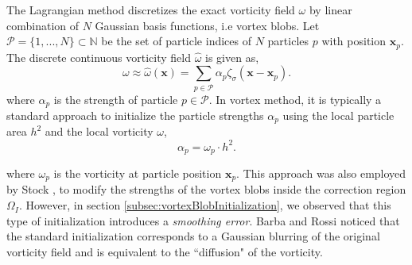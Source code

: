 
	The Lagrangian method discretizes the exact vorticity field $\omega$ by linear combination of $N$ Gaussian basis functions, i.e vortex blobs. Let $\mathcal{P} = \{1,...,N\}\subset\mathbb{N}$ be the set of particle indices of $N$ particles $p$ with position $\mathbf{x}_p$. The discrete continuous vorticity field $\hat{\omega}$ is given as,
		\begin{equation}
		\omega \approx \hat{\omega}(\mathbf{x}) = \sum_{p\in\mathcal{P}} \alpha_p \zeta_{\sigma}(\mathbf{x} - \mathbf{x}_p).
		\label{eq:coupling-mollifiedVorticityDistributionEquation}
		\end{equation}
	where $\alpha_p$ is the strength of particle $p\in\mathcal{P}$. In vortex method, it is typically a standard approach to initialize the particle strengths $\alpha_p$ using the local particle area $h^2$ and the local vorticity $\omega$,
		\begin{equation}
		\alpha_p = \omega_p\cdot{h^2}.
		\label{eq:coupling-standardInitialization}
		\end{equation}
	
	where $\omega_p$ is the vorticity at particle position $\mathbf{x}_p$. This approach was also employed by Stock \cite{Stock2010a}, to modify the strengths of the vortex blobs inside the correction region $\Omega_I$. However, in section \ref{subsec:vortexBlobInitialization}, we observed that this type of initialization introduces a \textit{smoothing error}. Barba and Rossi \cite{Barba2010a} noticed that the standard initialization corresponds to a Gaussian blurring of the original vorticity field and is equivalent to the ``diffusion" of the vorticity. 
	
